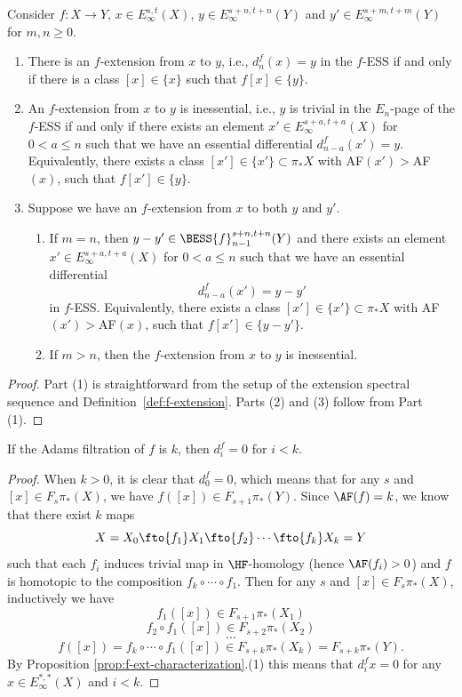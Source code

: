 \begin{proposition}\label{prop:f-ext-characterization}
Consider $f: X\to Y$, $x\in E_\infty^{s,t}(X)$, $y\in E_\infty^{s+n,t+n}(Y)$ and $y'\in E_\infty^{s+m,t+m}(Y)$ for $m,n\ge 0$.
\begin{enumerate}
    \item There is an $f$-extension from $x$ to $y$, i.e., $d_n^{f}(x)=y$ in the $f$-ESS if and only if there is a class $[x]\in \{x\}$ such that $f[x]\in \{y\}$.
    \item An $f$-extension from $x$ to $y$ is inessential, i.e., $y$ is trivial in the $E_n$-page of the $f$-ESS if and only if there exists an element $x'\in E_\infty^{s+a,t+a}(X)$ for $0<a\le n$ such that we have an essential differential $d_{n-a}^{f}(x')=y$. Equivalently, there exists a class $[x'] \in \{x'\} \subset \pi_*X$ with AF$(x')>$AF$(x)$, such that $f[x'] \in \{y\}$.
    
    \item Suppose we have an $f$-extension from $x$ to both $y$ and $y'$.
    \begin{enumerate}
        \item If $m=n$, then $y-y'\in \BESS{f}^{s+n,t+n}_{n-1}(Y)$ and there exists an element $x'\in E_\infty^{s+a,t+a}(X)$ for $0<a\le n$ such that we have an essential differential 
        $$d_{n-a}^{f}(x') = y-y'$$
        in $f$-ESS. Equivalently, there exists a class $[x'] \in \{x'\} \subset \pi_*X$ with AF$(x')>$AF$(x)$, such that $f[x'] \in \{y-y'\}$. 
        \item If $m>n$, then the $f$-extension from $x$ to $y$ is inessential.
     \end{enumerate}
\end{enumerate}
\end{proposition}

\begin{proof}
    Part (1) is straightforward from the setup of the extension spectral sequence and Definition~\ref{def:f-extension}. Parts (2) and (3) follow from Part (1).
\end{proof}

\begin{corollary}\label{cor:af-vanishing}
    If the Adams filtration of $f$ is $k$, then
    $d^f_i=0$ for $i<k$.
\end{corollary}

\begin{proof}
    When $k>0$, it is clear that $d^f_0=0$, which means that for any $s$ and $[x]\in F_s\pi_*(X)$, we have $f([x])\in F_{s+1}\pi_*(Y)$. Since $\AF(f)=k$, we know that there exist $k$ maps
    $$X=X_0\fto{f_1}X_1\fto{f_2}\cdots\fto{f_k}X_k=Y$$
    such that each $f_i$ induces trivial map in $\HF$-homology (hence $\AF(f_i)>0$) and $f$ is homotopic to the composition $f_k\circ \cdots\circ f_1.$
    Then for any $s$ and $[x]\in F_s\pi_*(X)$, inductively we have
    $$f_1([x])\in F_{s+1}\pi_*(X_1)$$
    $$f_2\circ f_1([x])\in F_{s+2}\pi_*(X_2)$$
    $$\cdots$$
    $$f([x])=f_k\circ\cdots\circ f_1([x])\in F_{s+k}\pi_*(X_k)=F_{s+k}\pi_*(Y).$$
    By Proposition \ref{prop:f-ext-characterization}.(1) this means that $d_i^fx=0$ for any $x\in E_\infty^{*,*}(X)$ and $i<k$.
\end{proof}

